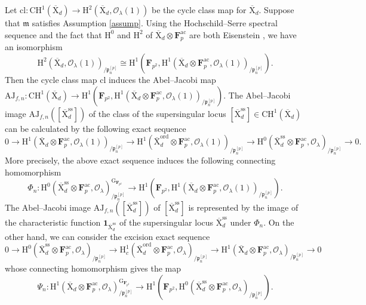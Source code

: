 \documentclass[10pt]{amsart}
\numberwithin{equation}{section}
\theoremstyle{plain}
\numberwithin{equation}{section}
\theoremstyle{definition}
\theoremstyle{remark}
\def\ord{\mathrm{ord}}
\def\ac{\mathrm{ac}}
\def\frakm{\mathfrak{m}}
\def\ss{\mathrm{ss}}
\def\ac{\mathrm{ac}}
\def\calO{\mathcal{O}}
\def\frakm{\mathfrak{m}}
\def\frakp{\mathfrak{p}}
\def\FF{\mathbf{F}}
\def\rmG{\mathrm{G}}
\def\rmH{\mathrm{H}}
\def\rmX{\mathrm{X}}
\begin{document}
Let  $\mathrm{cl}: \mathrm{CH}^{1}(\overline{\rmX}_{d})\rightarrow \rmH^{2}(\overline{\rmX}_{d}, \calO_{\lambda}(1))$ be the cycle class map for $\overline{\rmX}_{d}$.
Suppose that $\frakm$ satisfies Assumption \ref{assump}. Using the Hochschild--Serre spectral sequence and the fact that $\rmH^{0}$ and $\rmH^{2}$ of $\overline{\rmX}_{d}\otimes{\FF^{\ac}_{p}}$ are both Eisenstein \cite[Lemma 3]{DT}, we have an isomorphism 
\begin{equation*}
\rmH^{2}(\overline{\rmX}_{d}, \calO_{\lambda}(1))_{/\frakp^{[p]}_{n}}\cong \rmH^{1}(\FF_{p^{2}}, \rmH^{1}(\overline{\rmX}_{d}\otimes\FF^{\ac}_{p}, \calO_{\lambda}(1))_{/\frakp^{[p]}_{n}}).
\end{equation*}
Then the cycle class map $\mathrm{cl}$ induces the Abel--Jacobi map $\mathrm{AJ}_{f, n}: \mathrm{CH}^{1}(\overline{\rmX}_{d})\rightarrow  \rmH^{1}(\FF_{p^{2}}, \rmH^{1}(\overline{\rmX}_{d}\otimes\FF^{\ac}_{p}, \calO_{\lambda}(1))_{/\frakp^{[p]}_{n}})$.
The Abel--Jacobi image $\mathrm{AJ}_{f, n}([\overline{\rmX}^{\ss}_{d}])$ of the class of the supersingular locus $[\overline{\rmX}^{\ss}_{d}]\in\mathrm{CH}^{1}(\overline{\rmX}_{d})$ can be calculated by the following exact sequence
\begin{equation*}
0\rightarrow\rmH^{1}(\overline{\rmX}_{d}\otimes\FF^{\ac}_{p}, \calO_{\lambda}(1))_{/\frakp^{[p]}_{n}}\rightarrow \rmH^{1}(\overline{\rmX}^{\ord}_{d}\otimes\FF^{\ac}_{p}, \calO_{\lambda}(1))_{/\frakp^{[p]}_{n}} \rightarrow \rmH^{0}(\overline{\rmX}^{\ss}_{d}\otimes\FF^{\ac}_{p}, \calO_{\lambda})_{/\frakp^{[p]}_{n}}\rightarrow 0. 
\end{equation*}
More precisely, the above exact sequence induces the following connecting homomorphism
\begin{equation}\label{Phin}
\Phi_{n}: \rmH^{0}(\overline{\rmX}^{\ss}_{d}\otimes\FF^{\ac}_{p}, \calO_{\lambda})^{\rmG_{\FF_{p^{2}}}}_{/\frakp^{[p]}_{n}}\rightarrow  \rmH^{1}(\FF_{p^{2}}, \rmH^{1}(\overline{\rmX}_{d}\otimes \FF^{\ac}_{p}, \calO_{\lambda}(1))_{/\frakp^{[p]}_{n}}).
\end{equation}
The Abel--Jacobi image $\mathrm{AJ}_{f, n}([\overline{\rmX}^{\ss}_{d}])$ of $[\overline{\rmX}^{\ss}_{d}]$ is represented by the image of the characteristic function $\mathbf{1}_{\overline{\rmX}^{\ss}_{d}}$ of the supersingular locus $\overline{\rmX}^{\ss}_{d}$ under $\Phi_{n}$. On the other hand, we can consider the excision exact sequence 
\begin{equation}\label{Psin}
0\rightarrow\rmH^{0}(\overline{\rmX}^{\ss}_{d}\otimes{\FF^{\ac}_{p}}, \calO_{\lambda})_{/\frakp^{[p]}_{n}}\rightarrow \rmH^{1}_{c}(\overline{\rmX}^{\ord}_{d}\otimes{ \FF^{\ac}_{p}}, \calO_{\lambda})_{/\frakp^{[p]}_{n}}\rightarrow \rmH^{1}(\overline{\rmX}_{d}\otimes{\FF^{\ac}_{p}}, \calO_{\lambda})_{/\frakp^{[p]}_{n}}\rightarrow 0
\end{equation}
whose connecting homomorphism gives the map
\begin{equation*}
\Psi_{n}: \rmH^{1}(\overline{\rmX}_{d}\otimes{\FF^{\ac}_{p}}, \calO_{\lambda})^{\rmG_{\FF_{p^{2}}}}_{/\frakp^{[p]}_{n}}\rightarrow   \rmH^{1}(\FF_{p^{2}}, \rmH^{0}(\overline{\rmX}^{\ss}_{d}\otimes\FF^{\ac}_{p}, \calO_{\lambda})_{/\frakp^{[p]}_{n}}).
\end{equation*}
\end{document}
